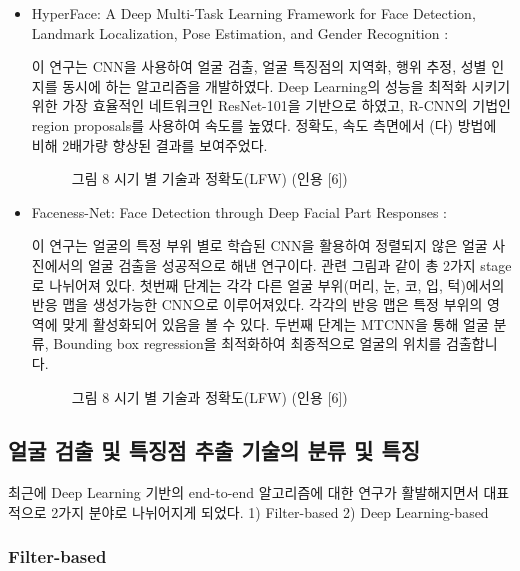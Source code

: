 \documentclass{oblivoir}
\begin{document}
\begin{itemize}[가. ]
    \item HyperFace: A Deep Multi-Task Learning Framework for Face Detection, Landmark Localization, Pose Estimation, and Gender Recognition : 
 
이 연구는 CNN을 사용하여 얼굴 검출, 얼굴 특징점의 지역화, 행위 추정, 성별 인지를 동시에 하는 알고리즘을 개발하였다. 
Deep Learning의 성능을 최적화 시키기 위한 가장 효율적인 네트워크인 ResNet-101을 기반으로 하였고, R-CNN의 기법인 region proposals를 사용하여 속도를 높였다. 
정확도, 속도 측면에서 (다) 방법에 비해 2배가량 향상된 결과를 보여주었다. 

\begin{figure}[h!]
    \centering
    \caption{그림 8  시기 별 기술과 정확도(LFW) (인용 [6])    }
\end{figure}

    \item Faceness-Net: Face Detection through Deep Facial Part Responses : 
  
이 연구는 얼굴의 특정 부위 별로 학습된 CNN을 활용하여 정렬되지 않은 얼굴 사진에서의 얼굴 검출을 성공적으로 해낸 연구이다. 
 관련 그림과 같이 총 2가지 stage로 나뉘어져 있다. 첫번째 단계는 각각 다른 얼굴 부위(머리, 눈, 코, 입, 턱)에서의 반응 맵을 생성가능한 CNN으로 이루어져있다. 
 각각의 반응 맵은 특정 부위의 영역에 맞게 활성화되어 있음을 볼 수 있다. 
 두번째 단계는 MTCNN을 통해 얼굴 분류, Bounding box regression을 최적화하여 최종적으로 얼굴의 위치를 검출합니다. 

 \begin{figure}[h!]
    \centering
    \caption{그림 8  시기 별 기술과 정확도(LFW) (인용 [6])    }
\end{figure}

\end{itemize}

\subsection{ 얼굴 검출 및 특징점 추출 기술의 분류 및 특징 }

 최근에 Deep Learning 기반의 end-to-end 알고리즘에 대한 연구가 활발해지면서 대표적으로 2가지 분야로 나뉘어지게 되었다. 1) Filter-based 2) Deep Learning-based

\subsubsection{Filter-based}
\end{document}
